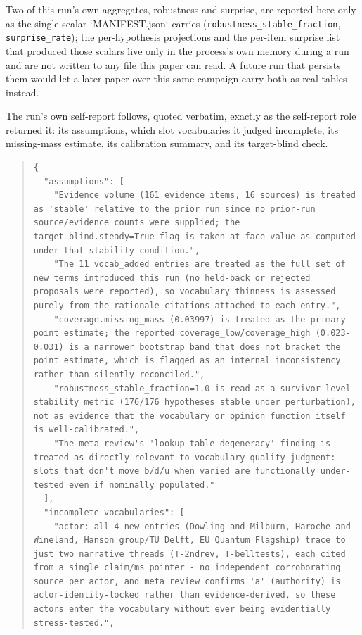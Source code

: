 \documentclass[11pt]{article}
\begin{document}
Two of this run's own aggregates, robustness and surprise, are reported here only as the single scalar `MANIFEST.json` carries (\texttt{robustness\_stable\_fraction}, \texttt{surprise\_rate}); the per-hypothesis projections and the per-item surprise list that produced those scalars live only in the process's own memory during a run and are not written to any file this paper can read. A future run that persists them would let a later paper over this same campaign carry both as real tables instead.

The run's own self-report follows, quoted verbatim, exactly as the self-report role returned it: its assumptions, which slot vocabularies it judged incomplete, its missing-mass estimate, its calibration summary, and its target-blind check.
\begin{quote}\small
\begin{verbatim}
{
  "assumptions": [
    "Evidence volume (161 evidence items, 16 sources) is treated as 'stable' relative to the prior run since no prior-run source/evidence counts were supplied; the target_blind.steady=True flag is taken at face value as computed under that stability condition.",
    "The 11 vocab_added entries are treated as the full set of new terms introduced this run (no held-back or rejected proposals were reported), so vocabulary thinness is assessed purely from the rationale citations attached to each entry.",
    "coverage.missing_mass (0.03997) is treated as the primary point estimate; the reported coverage_low/coverage_high (0.023-0.031) is a narrower bootstrap band that does not bracket the point estimate, which is flagged as an internal inconsistency rather than silently reconciled.",
    "robustness_stable_fraction=1.0 is read as a survivor-level stability metric (176/176 hypotheses stable under perturbation), not as evidence that the vocabulary or opinion function itself is well-calibrated.",
    "The meta_review's 'lookup-table degeneracy' finding is treated as directly relevant to vocabulary-quality judgment: slots that don't move b/d/u when varied are functionally under-tested even if nominally populated."
  ],
  "incomplete_vocabularies": [
    "actor: all 4 new entries (Dowling and Milburn, Haroche and Wineland, Hanson group/TU Delft, EU Quantum Flagship) trace to just two narrative threads (T-2ndrev, T-belltests), each cited from a single claim/ms pointer - no independent corroborating source per actor, and meta_review confirms 'a' (authority) is actor-identity-locked rather than evidence-derived, so these actors enter the vocabulary without ever being evidentially stress-tested.",

\end{verbatim}
\end{quote}
\end{document}
